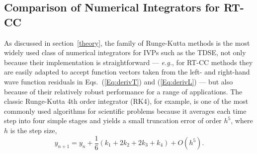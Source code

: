 \subsection{Comparison of Numerical Integrators for RT-CC} \label{result:integrator}

As discussed in section~\ref{theory}, the family of Runge-Kutta methods is the
most widely used class of numerical integrators for IVPs such as the TDSE, not
only because their implementation is straightforward --- \textit{e.g.}, for
RT-CC methods they are easily adapted to accept function vectors taken from the
left- and right-hand wave function residuals in Eqs.~(\ref{Eq:derivT}) and
(\ref{Eq:derivL}) --- but also because of their relatively robust performance
for a range of applications.  The classic Runge-Kutta 4th order integrator
(RK4), for example, is one of the most commonly used algorithms for scientific
problems because it averages each time step into four simple stages and yields a
small truncation error of order $h^{5}$, where $h$ is the step size,
\begin{equation}\label{eq:rk4truncation}
y_{n+1} = y_{n} + \frac{1}{6}(k_{1}+2k_{2}+2k_{3}+k_{4}) + \textit{O}(h^{5}).
\end{equation}

